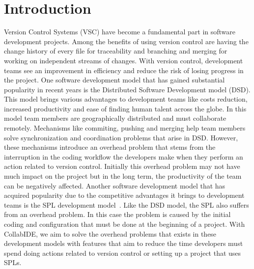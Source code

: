 %
%

\section{Introduction}
\label{sec:introduction}

Version Control Systems (VSC) have become a fundamental part in software development projects. 
Among the benefits of using version control are having the change history of every file for traceability 
and branching and merging for working on independent streams of changes. With version control, 
development teams see an improvement in efficiency and reduce the risk of losing progress in the 
project.
One software development model that has gained substantial popularity in recent years is the 
Distributed Software Development model (DSD). This model brings various advantages to 
development teams like costs reduction, increased productivity and ease of finding human talent 
across the globe. In this model team members are geographically distributed and must collaborate 
remotely. Mechanisms like commiting, pushing and merging help team members solve synchronization 
and coordination problems that arise in DSD. However, these mechanisms introduce an overhead 
problem that stems from the interruption in the coding workflow the developers make when they 
perform an action related to version control. Initially this overhead problem may not have much impact 
on the project but in the long term, the productivity of the team can be negatively affected.
Another software development model that has acquired popularity due to the competitive advantages 
it brings to development teams is the \ac{SPL} development model~\cite{pohl+05sple}. Like the DSD 
model, the SPL also suffers from an overhead problem. In this case the problem is caused by the initial 
coding and configuration that must be done at the beginning of a project.
With CollabIDE, we aim to solve the overhead problems that exists in these development models with 
features that aim to reduce the time developers must spend doing actions related to version control or 
setting up a project that uses \acp{SPL}.




\endinput